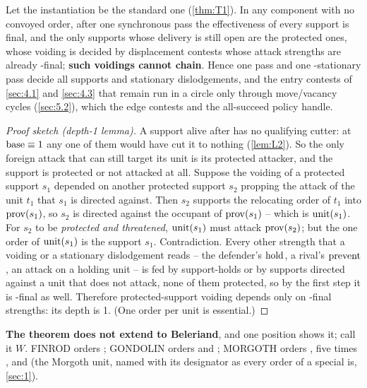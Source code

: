 \documentclass[12pt,a4paper]{article}
\begin{document}
\begin{theorem}\label{thm:T4}
Let the instantiation be the standard one (\cref{thm:T1}).
In any component with no convoyed order, after one synchronous  pass the effectiveness of every support is final, and the only supports whose delivery is still open are the protected ones, whose voiding is decided by displacement contests whose attack strengths are already -final; \textbf{such voidings cannot chain}.
Hence one  pass and one -stationary pass decide all supports and stationary dislodgements, and the entry contests of \cref{sec:4.1} and \cref{sec:4.3} that remain run in a circle only through move/vacancy cycles (\cref{sec:5.2}), which the edge contests and the all-succeed policy handle.
\end{theorem}
\begin{proof}[Proof sketch (depth-1 lemma)]
A support alive after  has no qualifying cutter: at $\operatorname{base} \equiv 1$ any one of them would have cut it to nothing (\cref{lem:L2}).
So the only foreign attack that can still target its unit is its protected attacker, and the support is protected or not attacked at all.
Suppose the voiding of a protected support $s_1$ depended on another protected support $s_2$ propping the attack of the unit $t_1$ that $s_1$ is directed against.
Then $s_2$ supports the relocating order of $t_1$ into $\operatorname{prov}(s_1)$, so $s_2$ is directed against the occupant of $\operatorname{prov}(s_1)$ -- which is $\operatorname{unit}(s_1)$.
For $s_2$ to be \emph{protected and threatened}, $\operatorname{unit}(s_1)$ must attack $\operatorname{prov}(s_2)$; but the one order of $\operatorname{unit}(s_1)$ is the support $s_1$.
Contradiction.
Every other strength that a voiding or a stationary dislodgement reads -- the defender's $\operatorname{hold}$, a rival's $\operatorname{prevent}$, an attack on a holding unit -- is fed by support-holds or by supports directed against a unit that does not attack, none of them protected, so by the first step it is -final as well.
Therefore protected-support voiding depends only on -final strengths: its depth is 1.
(One order per unit is essential.)
\end{proof}
\textbf{The theorem does not extend to Beleriand}, and one position shows it; call it $W$.
FINROD orders ; GONDOLIN orders  and ; MORGOTH orders , five times , and  (the Morgoth unit, named with its designator as every order of a special is, \cref{sec:1}).
\end{document}
